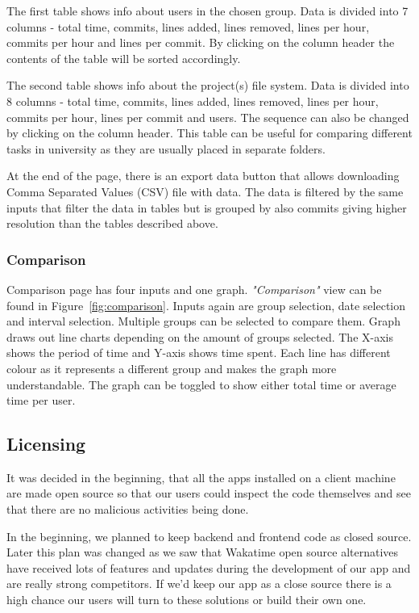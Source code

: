 The first table shows info about users in the chosen group.
Data is divided into 7 columns - total time, commits, lines added, lines removed, lines per hour, commits per hour and lines per commit.
By clicking on the column header the contents of the table will be sorted accordingly.

The second table shows info about the project(s) file system.
Data is divided into 8 columns - total time, commits, lines added, lines removed, lines per hour, commits per hour, lines per commit and users.
The sequence can also be changed by clicking on the column header.
This table can be useful for comparing different tasks in university as they are usually placed in separate folders.

At the end of the page, there is an export data button that allows downloading Comma Separated Values (CSV) file with data.
The data is filtered by the same inputs that filter the data in tables but is grouped
by also commits giving higher resolution than the tables described above.


\subsubsection{Comparison}\label{subsubsec:comparison}
Comparison page has four inputs and one graph.
\textit{"Comparison"} view can be found in Figure~\ref{fig:comparison}.
Inputs again are group selection, date selection and interval selection.
Multiple groups can be selected to compare them.
Graph draws out line charts depending on the amount of groups selected.
The X-axis shows the period of time and Y-axis shows time spent.
Each line has different colour as it represents a different group and makes the graph more understandable.
The graph can be toggled to show either total time or average time per user.

\subsection{Licensing}\label{subsec:licencing}
It was decided in the beginning, that all the apps installed on a client machine are made open source so that
our users could inspect the code themselves and see that there are no malicious activities being done.

In the beginning, we planned to keep backend and frontend code as closed source.
Later this plan was changed as we saw that Wakatime open source alternatives have received lots of features and updates
during the development of our app and are really strong competitors.
If we'd keep our app as a close source there is a high chance our users will turn to these solutions or build their own one.

